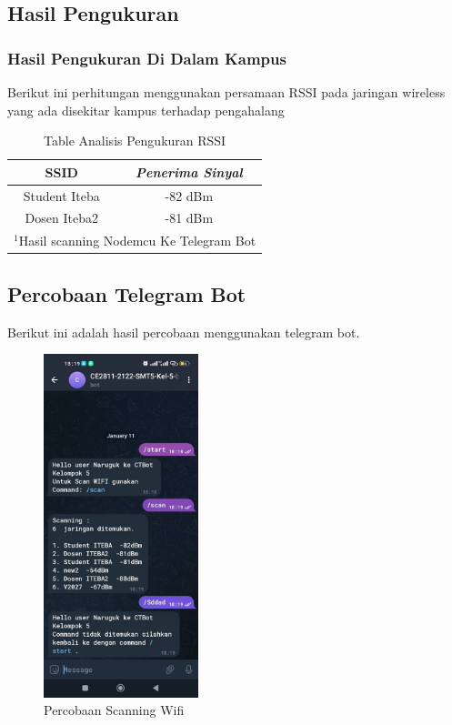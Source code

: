 \documentclass[conference]{IEEEtran}
\begin{document}
\subsection{Hasil Pengukuran}
\subsubsection{Hasil Pengukuran Di Dalam Kampus}
Berikut ini perhitungan menggunakan persamaan RSSI 
pada jaringan wireless yang ada disekitar kampus terhadap pengahalang

    \begin{table}[htbp]
        \caption{Table Analisis Pengukuran RSSI}
        \begin{center}
        \begin{tabular}{|c|c|}
            \hline
        \textbf{SSID}& \textbf{\textit{Penerima Sinyal}} \\
        \hline        
        Student Iteba  & -82 dBm   \\
        \hline
        Dosen Iteba2 & -81 dBm   \\        
        \hline
        \multicolumn{3}{l}{$^{\mathrm{1}}$Hasil scanning Nodemcu Ke Telegram Bot}
        \end{tabular}
        \label{tab1}
        \end{center}
        \end{table}

      

        \subsection{Percobaan Telegram Bot}
        Berikut ini adalah hasil percobaan menggunakan telegram bot.
        \begin{figure}[h]
            \centering
            \includegraphics[width=0.4\textwidth]{testing.jpeg}
            \caption{Percobaan Scanning Wifi}
        \end{figure}       
    
\end{document}
